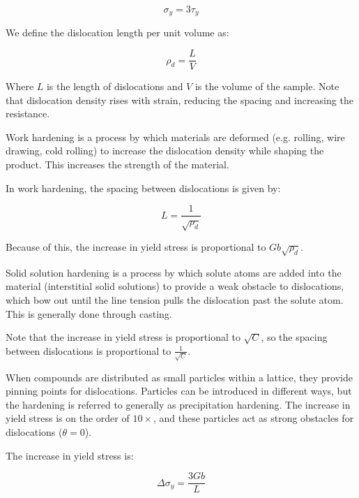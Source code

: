 \documentclass{article}
\begin{document}
\[ \sigma_y = 3\tau_y \]

\begin{definition}
    We define the dislocation length per unit volume as:

    \[ \rho_d = \frac{L}{V} \]

    Where $L$ is the length of dislocations and $V$ is the volume of the sample. Note that dislocation density rises with strain, reducing the spacing and increasing the resistance.
\end{definition}

\begin{definition}
    Work hardening is a process by which materials are deformed (e.g. rolling, wire drawing, cold rolling) to increase the dislocation density while shaping the product. This increases the strength of the material.
\end{definition}

In work hardening, the spacing between dislocations is given by:

\[ L = \frac{1}{\sqrt{\rho_d}} \]

Because of this, the increase in yield stress is proportional to $Gb\sqrt{\rho_d}$.

\begin{definition}
    Solid solution hardening is a process by which solute atoms are added into the material (interstitial solid solutions) to provide a weak obstacle to dislocations, which bow out until the line tension pulls the dislocation past the solute atom. This is generally done through casting.

    Note that the increase in yield stress is proportional to $\sqrt{C}$, so the spacing between dislocations is proportional to $\frac{1}{\sqrt{C}}$.
\end{definition}

\begin{definition}
    When compounds are distributed as small particles within a lattice, they provide pinning points for dislocations. Particles can be introduced in different ways, but the hardening is referred to generally as precipitation hardening. The increase in yield stress is on the order of $10 \times$, and these particles act as strong obstacles for dislocations ($\theta = 0$).

    The increase in yield stress is:

    \[ \Delta\sigma_y = \frac{3Gb}{L} \]
\end{definition}
\end{document}
